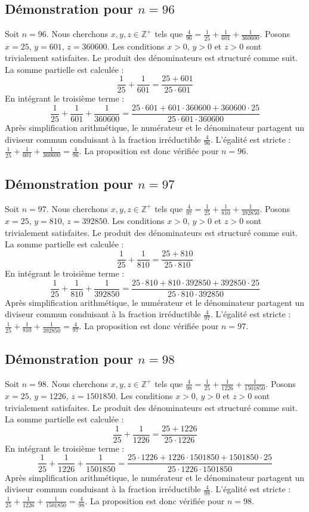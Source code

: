 \documentclass[11pt,a4paper]{article}
\begin{document}
\subsection{Démonstration pour $n = 96$}
Soit $n = 96$. Nous cherchons $x, y, z \in \mathbb{Z}^{+}$ tels que $\frac{4}{96} = \frac{1}{25} + \frac{1}{601} + \frac{1}{360600}$.
Posons $x = 25$, $y = 601$, $z = 360600$.
Les conditions $x > 0$, $y > 0$ et $z > 0$ sont trivialement satisfaites.
Le produit des dénominateurs est structuré comme suit. La somme partielle est calculée :
$$ \frac{1}{25} + \frac{1}{601} = \frac{25+601}{25 \cdot 601} $$
En intégrant le troisième terme :
$$ \frac{1}{25} + \frac{1}{601} + \frac{1}{360600} = \frac{25 \cdot 601 + 601 \cdot 360600 + 360600 \cdot 25}{25 \cdot 601 \cdot 360600} $$
Après simplification arithmétique, le numérateur et le dénominateur partagent un diviseur commun conduisant à la fraction irréductible $\frac{4}{96}$.
L'égalité est stricte : $\frac{1}{25} + \frac{1}{601} + \frac{1}{360600} = \frac{4}{96}$.
La proposition est donc vérifiée pour $n = 96$.
\subsection{Démonstration pour $n = 97$}
Soit $n = 97$. Nous cherchons $x, y, z \in \mathbb{Z}^{+}$ tels que $\frac{4}{97} = \frac{1}{25} + \frac{1}{810} + \frac{1}{392850}$.
Posons $x = 25$, $y = 810$, $z = 392850$.
Les conditions $x > 0$, $y > 0$ et $z > 0$ sont trivialement satisfaites.
Le produit des dénominateurs est structuré comme suit. La somme partielle est calculée :
$$ \frac{1}{25} + \frac{1}{810} = \frac{25+810}{25 \cdot 810} $$
En intégrant le troisième terme :
$$ \frac{1}{25} + \frac{1}{810} + \frac{1}{392850} = \frac{25 \cdot 810 + 810 \cdot 392850 + 392850 \cdot 25}{25 \cdot 810 \cdot 392850} $$
Après simplification arithmétique, le numérateur et le dénominateur partagent un diviseur commun conduisant à la fraction irréductible $\frac{4}{97}$.
L'égalité est stricte : $\frac{1}{25} + \frac{1}{810} + \frac{1}{392850} = \frac{4}{97}$.
La proposition est donc vérifiée pour $n = 97$.
\subsection{Démonstration pour $n = 98$}
Soit $n = 98$. Nous cherchons $x, y, z \in \mathbb{Z}^{+}$ tels que $\frac{4}{98} = \frac{1}{25} + \frac{1}{1226} + \frac{1}{1501850}$.
Posons $x = 25$, $y = 1226$, $z = 1501850$.
Les conditions $x > 0$, $y > 0$ et $z > 0$ sont trivialement satisfaites.
Le produit des dénominateurs est structuré comme suit. La somme partielle est calculée :
$$ \frac{1}{25} + \frac{1}{1226} = \frac{25+1226}{25 \cdot 1226} $$
En intégrant le troisième terme :
$$ \frac{1}{25} + \frac{1}{1226} + \frac{1}{1501850} = \frac{25 \cdot 1226 + 1226 \cdot 1501850 + 1501850 \cdot 25}{25 \cdot 1226 \cdot 1501850} $$
Après simplification arithmétique, le numérateur et le dénominateur partagent un diviseur commun conduisant à la fraction irréductible $\frac{4}{98}$.
L'égalité est stricte : $\frac{1}{25} + \frac{1}{1226} + \frac{1}{1501850} = \frac{4}{98}$.
La proposition est donc vérifiée pour $n = 98$.
\end{document}
